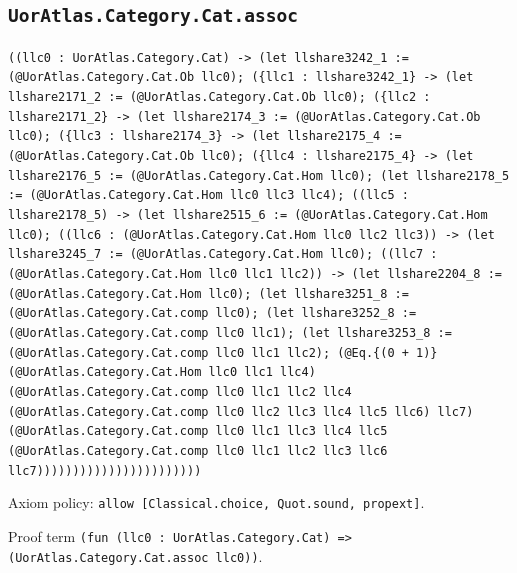 \documentclass[11pt]{article}
\begin{document}
\subsection*{\texttt{UorAtlas.Category.Cat.assoc}}
\noindent\texttt{((llc0 : UorAtlas.Category.Cat) -> (let llshare3242\_1 := (@UorAtlas.Category.Cat.Ob llc0); (\{llc1 : llshare3242\_1\} -> (let llshare2171\_2 := (@UorAtlas.Category.Cat.Ob llc0); (\{llc2 : llshare2171\_2\} -> (let llshare2174\_3 := (@UorAtlas.Category.Cat.Ob llc0); (\{llc3 : llshare2174\_3\} -> (let llshare2175\_4 := (@UorAtlas.Category.Cat.Ob llc0); (\{llc4 : llshare2175\_4\} -> (let llshare2176\_5 := (@UorAtlas.Category.Cat.Hom llc0); (let llshare2178\_5 := (@UorAtlas.Category.Cat.Hom llc0 llc3 llc4); ((llc5 : llshare2178\_5) -> (let llshare2515\_6 := (@UorAtlas.Category.Cat.Hom llc0); ((llc6 : (@UorAtlas.Category.Cat.Hom llc0 llc2 llc3)) -> (let llshare3245\_7 := (@UorAtlas.Category.Cat.Hom llc0); ((llc7 : (@UorAtlas.Category.Cat.Hom llc0 llc1 llc2)) -> (let llshare2204\_8 := (@UorAtlas.Category.Cat.Hom llc0); (let llshare3251\_8 := (@UorAtlas.Category.Cat.comp llc0); (let llshare3252\_8 := (@UorAtlas.Category.Cat.comp llc0 llc1); (let llshare3253\_8 := (@UorAtlas.Category.Cat.comp llc0 llc1 llc2); (@Eq.\{(0 + 1)\} (@UorAtlas.Category.Cat.Hom llc0 llc1 llc4) (@UorAtlas.Category.Cat.comp llc0 llc1 llc2 llc4 (@UorAtlas.Category.Cat.comp llc0 llc2 llc3 llc4 llc5 llc6) llc7) (@UorAtlas.Category.Cat.comp llc0 llc1 llc3 llc4 llc5 (@UorAtlas.Category.Cat.comp llc0 llc1 llc2 llc3 llc6 llc7)))))))))))))))))))))))}\par
\noindent Axiom policy: \texttt{allow [Classical.choice, Quot.sound, propext]}.\par
\noindent Proof term \texttt{(fun (llc0 : UorAtlas.Category.Cat) => (UorAtlas.Category.Cat.assoc llc0))}.\par
\end{document}
